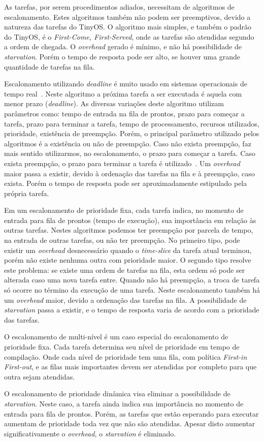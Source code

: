 As tarefas, por serem procedimentos adiados, necessitam de algoritmos de escalonamento. Estes algoritmos também não
podem ser preemptivos, devido a natureza das tarefas do TinyOS.
O algoritmo mais simples, e também o padrão do TinyOS, é o \textit{First-Come, First-Served}, onde as tarefas são
atendidas segundo a ordem de chegada. O \textit{overhead} gerado é mínimo, e não há possibilidade de \textit{starvation}. 
Porém o tempo de resposta pode ser alto, se houver uma grande quantidade de tarefas na fila.

Escalonamento utilizando \textit{deadline} é muito usado em sistemas operacionais de tempo real~\cite{Stallings/04}. Neste algoritmo
a próxima tarefa a ser executada é aquela com menor prazo (\textit{deadline}). As diversas variações deste algoritmo utilizam
parâmetros como: tempo de entrada na fila de prontos, prazo para começar a tarefa, prazo para terminar a tarefa, tempo
de processamento, recursos utilizados, prioridade, existência de preempção.
Porém, o principal parâmetro utilizado pelos algoritmos é a existência ou não de preempção. Caso não exista preempção,
faz mais sentido utilizarmos, no escalonamento, o prazo para começar a tarefa. Caso exista preempção, o prazo para
terminar a tarefa é utilizado~\cite{Stallings/04}.
Um \textit{overhead} maior passa a existir, devido à ordenação das tarefas na fila e à preempção, caso exista.
Porém o tempo de resposta pode ser aproximadamente estipulado pela própria tarefa.

Em um escalonamento de prioridade fixa, cada tarefa indica, no momento de entrada para fila de prontos (tempo de
execução), sua importância em relação às
outras tarefas. Nestes algoritmos podemos ter preempção por parcela de tempo, na entrada de outras tarefas, ou não ter preempção. 
No primeiro tipo, pode existir um \textit{overhead} desnecessário quando o \textit{time-slice} da tarefa atual terminou,
porém não existe nenhuma outra com prioridade maior. O segundo tipo resolve este problema: se existe uma ordem de
tarefas na fila, esta ordem só pode ser alterada caso uma nova tarefa entre.
Quando não há preempção, a troca de tarefa só ocorre no término da execução de uma tarefa.
Neste escalonamento também há um \textit{overhead} maior, devido a ordenação das tarefas na fila.
A possibilidade de \textit{starvation} passa a existir, e o tempo de resposta varia de acordo com a prioridade das
tarefas.

O escalonamento de multi-nível é um caso especial do escalonamento de prioridade fixa. 
Cada tarefa determina seu nível de prioridade em tempo de compilação. Onde cada nível de prioridade tem uma fila, com 
política \textit{First-in First-out}, e as filas mais importantes devem ser atendidas por completo para que outra sejam
atendidas.

O escalonamento de prioridade dinâmica visa eliminar a possibilidade de \textit{starvation}. Neste caso, a tarefa ainda
indica sua importância no momento de entrada para fila de prontos. Porém, as tarefas que estão esperando para executar
aumentam de prioridade toda vez que não são atendidas. Apesar disto aumentar significativamente o \textit{overhead}, o
\textit{starvation} é eliminado.


